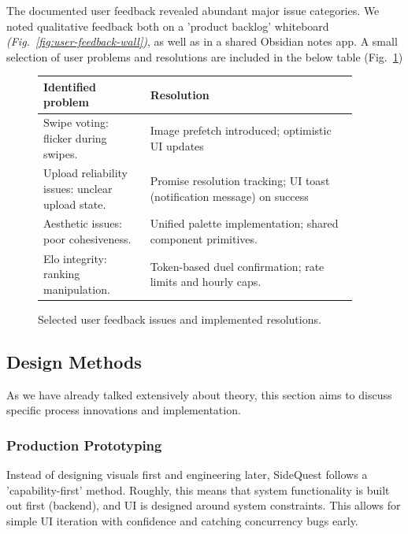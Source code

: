 \documentclass[12pt]{article}
\begin{document}
The documented user feedback revealed abundant major issue categories. We noted qualitative feedback both on a 'product backlog' whiteboard \textit{(Fig.~\ref{fig:user-feedback-wall})}, as well as in a shared Obsidian notes app. A small selection of user problems and resolutions are included in the below table (Fig.~\ref{fig:user-feedback-table})


\begin{figure}[!b]
  \centering
  \renewcommand{\arraystretch}{1.25}
  \begin{tabular}{|p{0.32\linewidth}|p{0.62\linewidth}|}
  \hline
  \textbf{Identified problem} & \textbf{Resolution} \\
  \hline
  Swipe voting: flicker during swipes. & Image prefetch introduced; optimistic UI updates \\
  \hline
  Upload reliability issues: unclear upload state. & Promise resolution tracking; UI toast (notification message) on success \\
  \hline
  Aesthetic issues: poor cohesiveness. & Unified palette implementation; shared component primitives. \\
  \hline
  Elo integrity: ranking manipulation. & Token-based duel confirmation; rate limits and hourly caps. \\
  \hline
  \end{tabular}
  \caption[User Feedback Table]{Selected user feedback issues and implemented resolutions.}
  \label{fig:user-feedback-table}
\end{figure}

\subsection{Design Methods }

As we have already talked extensively about theory, this section aims to discuss specific process innovations and implementation.

\subsubsection{Production Prototyping}

Instead of designing visuals first and engineering later, SideQuest follows a 'capability-first' method. Roughly, this means that system functionality is built out first (backend), and UI is designed around system constraints. This allows for simple UI iteration with confidence and catching concurrency bugs early.
\end{document}
